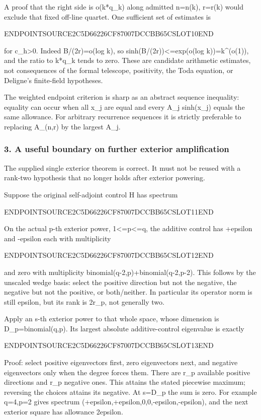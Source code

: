 A proof that the right side is o(k*q\_k) along admitted n=n(k), r=r(k) would exclude that fixed off-line quartet. One sufficient set of estimates is

ENDPOINTSOURCE2C5D66226CF87007DCCBB65CSLOT10END

for c\_h\textgreater0. Indeed B/(2r)=o(log k), so sinh(B/(2r))\textless=exp(o(log k))=k\^{}(o(1)), and the ratio to k*q\_k tends to zero. These are candidate arithmetic estimates, not consequences of the formal telescope, positivity, the Toda equation, or Deligne's finite-field hypotheses.

The weighted endpoint criterion is sharp as an abstract sequence inequality: equality can occur when all x\_j are equal and every A\_j sinh(x\_j) equals the same allowance. For arbitrary recurrence sequences it is strictly preferable to replacing A\_(n,r) by the largest A\_j.

\subsubsection{3. A useful boundary on further exterior amplification}\label{endpoint-pr23_original--a-useful-boundary-on-further-exterior-amplification}

The supplied single exterior theorem is correct. It must not be reused with a rank-two hypothesis that no longer holds after exterior powering.

Suppose the original self-adjoint control H has spectrum

ENDPOINTSOURCE2C5D66226CF87007DCCBB65CSLOT11END

On the actual p-th exterior power, 1\textless=p\textless=q, the additive control has +epsilon and -epsilon each with multiplicity

ENDPOINTSOURCE2C5D66226CF87007DCCBB65CSLOT12END

and zero with multiplicity binomial(q-2,p)+binomial(q-2,p-2). This follows by the unscaled wedge basis: select the positive direction but not the negative, the negative but not the positive, or both/neither. In particular its operator norm is still epsilon, but its rank is 2r\_p, not generally two.

Apply an s-th exterior power to that whole space, whose dimension is D\_p=binomial(q,p). Its largest absolute additive-control eigenvalue is exactly

ENDPOINTSOURCE2C5D66226CF87007DCCBB65CSLOT13END

Proof: select positive eigenvectors first, zero eigenvectors next, and negative eigenvectors only when the degree forces them. There are r\_p available positive directions and r\_p negative ones. This attains the stated piecewise maximum; reversing the choices attains its negative. At s=D\_p the sum is zero. For example q=4,p=2 gives spectrum (+epsilon,+epsilon,0,0,-epsilon,-epsilon), and the next exterior square has allowance 2epsilon.

